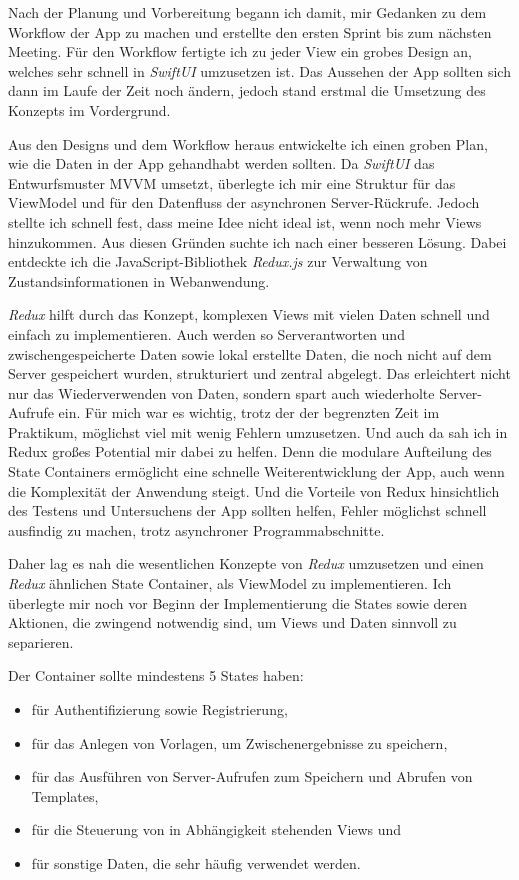 \documentclass[nomenclature, onesided, 150]{HSMW-Thesis}
\begin{document}
		Nach der Planung und Vorbereitung begann ich damit, mir Gedanken zu dem Workflow der App zu machen und erstellte den ersten Sprint bis zum nächsten Meeting. Für den Workflow fertigte ich zu jeder View ein grobes Design an, welches sehr schnell in \textit{SwiftUI} umzusetzen ist. Das Aussehen der App sollten sich dann im Laufe der Zeit noch ändern, jedoch stand erstmal die Umsetzung des Konzepts im Vordergrund. 

		Aus den Designs und dem Workflow heraus entwickelte ich einen groben Plan, wie die Daten in der App gehandhabt werden sollten. Da \textit{SwiftUI} das Entwurfsmuster MVVM umsetzt, überlegte ich mir eine Struktur für das ViewModel und für den Datenfluss der asynchronen Server-Rückrufe. Jedoch stellte ich schnell fest, dass meine Idee nicht ideal ist, wenn noch mehr Views hinzukommen. Aus diesen Gründen suchte ich nach einer besseren Lösung. Dabei entdeckte ich die JavaScript-Bibliothek \textit{Redux.js} zur Verwaltung von Zustandsinformationen in Webanwendung. 
		
		\textit{Redux} hilft durch das Konzept, komplexen Views mit vielen Daten schnell und einfach zu implementieren. Auch werden so Serverantworten und zwischengespeicherte Daten sowie lokal erstellte Daten, die noch nicht auf dem Server gespeichert wurden, strukturiert und zentral abgelegt. Das erleichtert nicht nur das Wiederverwenden von Daten, sondern spart auch wiederholte Server-Aufrufe ein. Für mich war es wichtig, trotz der der begrenzten Zeit im Praktikum, möglichst viel mit wenig Fehlern umzusetzen. Und auch da sah ich in Redux großes Potential mir dabei zu helfen. Denn die modulare Aufteilung des State Containers ermöglicht eine schnelle Weiterentwicklung der App, auch wenn die Komplexität der Anwendung steigt. Und die Vorteile von Redux hinsichtlich des Testens und Untersuchens der App sollten helfen, Fehler möglichst schnell ausfindig zu machen, trotz asynchroner Programmabschnitte.
		
		Daher lag es nah die wesentlichen Konzepte von \textit{Redux} umzusetzen und einen \textit{Redux} ähnlichen State Container, als ViewModel zu implementieren. Ich überlegte mir noch vor Beginn der Implementierung die States sowie deren Aktionen, die zwingend notwendig sind, um Views und Daten sinnvoll zu separieren.
		
		
		
		Der Container sollte mindestens 5 States haben: 
		\begin{itemize}
			\item für Authentifizierung sowie Registrierung,
			\item für das Anlegen von Vorlagen, um Zwischenergebnisse zu speichern,
			\item für das Ausführen von Server-Aufrufen zum Speichern und Abrufen von Templates, 
			\item für die Steuerung von in Abhängigkeit stehenden Views und
			\item für sonstige Daten, die sehr häufig verwendet werden.
		\end{itemize}
		
\end{document}
